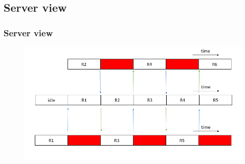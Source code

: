 \subsection{Server view}
\begin{frame}
    \frametitle{Server view}
    \begin{figure}
		\includegraphics[scale=0.3]{figure/serverview.png}
	\end{figure}
\end{frame}



